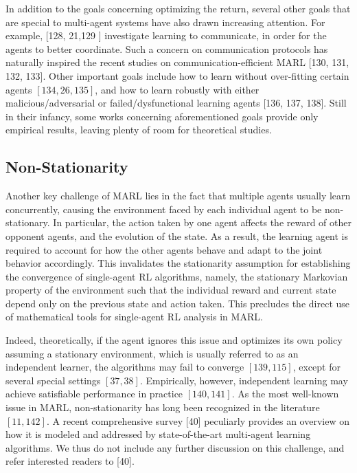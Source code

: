 \documentclass[10pt]{article}
\begin{document}
In addition to the goals concerning optimizing the return, several other goals that are special to multi-agent systems have also drawn increasing attention. For example, [128, 21,129 ] investigate learning to communicate, in order for the agents to better coordinate. Such a concern on communication protocols has naturally inspired the recent studies on communication-efficient MARL [130, 131, 132, 133]. Other important goals include how to learn without over-fitting certain agents $[134,26,135]$, and how to learn robustly with either malicious/adversarial or failed/dysfunctional learning agents [136, 137, 138]. Still in their infancy, some works concerning aforementioned goals provide only empirical results, leaving plenty of room for theoretical studies.

\subsection{Non-Stationarity}
Another key challenge of MARL lies in the fact that multiple agents usually learn concurrently, causing the environment faced by each individual agent to be non-stationary. In particular, the action taken by one agent affects the reward of other opponent agents, and the evolution of the state. As a result, the learning agent is required to account for how the other agents behave and adapt to the joint behavior accordingly. This invalidates the stationarity assumption for establishing the convergence of single-agent RL algorithms, namely, the stationary Markovian property of the environment such that the individual reward and current state depend only on the previous state and action taken. This precludes the direct use of mathematical tools for single-agent RL analysis in MARL.

Indeed, theoretically, if the agent ignores this issue and optimizes its own policy assuming a stationary environment, which is usually referred to as an independent learner, the algorithms may fail to converge $[139,115]$, except for several special settings $[37,38]$. Empirically, however, independent learning may achieve satisfiable performance in practice $[140,141]$. As the most well-known issue in MARL, non-stationarity has long been recognized in the literature $[11,142]$. A recent comprehensive survey [40] peculiarly provides an overview on how it is modeled and addressed by state-of-the-art multi-agent learning algorithms. We thus do not include any further discussion on this challenge, and refer interested readers to [40].
\end{document}

